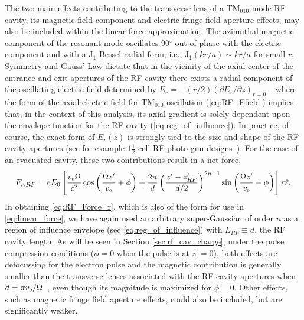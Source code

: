 The two main effects contributing to the transverse lens of a $\text{TM}_{010}$-mode RF cavity, its magnetic field component and electric fringe field aperture effects, may also be included within the linear force approximation.
The azimuthal magnetic component of the resonant mode oscillates 90$^{\circ}$ out of phase with the electric component and with a $\operatorname{ J_{1} }$ Bessel radial form; i.e., $ \operatorname{ J_{1} }( k r / a ) \sim k r / a $ for small $r$.
Symmetry and Gauss' Law dictate that in the vicinity of the axial center of the entrance and exit apertures of the RF cavity there exists a radial component of the oscillating electric field determined by $ E_{r} = -\left ( r / 2 \right ) \left ( \partial E_{z} / \partial z \right )_{r=0} $~\cite{kim_rf_1989}, where the form of the axial electric field for $\text{TM}_{010}$ oscillation (\ref{eq:RF_Efield}) implies that, in the context of this analysis, its axial gradient is solely dependent upon the envelope function for the RF cavity (\ref{eq:reg_of_influence}).
In practice, of course, the exact form of $E_{r}(z)$ is strongly tied to the size and shape of the RF cavity apertures (see for example $1 \frac{1}{2}$-cell RF photo-gun designs~\cite{mcdonald_design_1988}). 
For the case of an evacuated cavity, these two contributions result in a net force,
\begin{equation} \label{eq:RF_Force_r}
  F_{ r , RF } = e E_{0} \left [ 
    \frac{ v_{{\scriptscriptstyle 0}} \Omega }{c^{2}} \cos \left ( \frac{ \Omega z^{\prime} }{ v_{{\scriptscriptstyle 0}} } + \phi \right ) + \frac{2 n}{d} \left ( \frac{z^{\prime} - z^{\prime}_{RF}}{d / 2} \right )^{2 n - 1} \sin \left ( \frac{ \Omega z^{\prime} }{ v_{{\scriptscriptstyle 0}} } + \phi \right )
   \right ] r \hat{ r } \text{.}
\end{equation}
In obtaining \ref{eq:RF_Force_r}, which is also of the form for use in \ref{eq:linear_force}, we have again used an arbitrary super-Gaussian of order $n$ as a region of influence envelope (see \ref{eq:reg_of_influence}) with $L_{RF} \equiv d$, the RF cavity length.
As will be seen in Section \ref{sec:rf_cav_charge}, under the pulse compression conditions ($\phi = 0$ when the pulse is at $z^{\prime} = 0$), both effects are defocussing for the electron pulse and the magnetic contribution is generally smaller than the transverse lenses associated with the RF cavity apertures when $ d = \pi v_{{\scriptscriptstyle 0}} / \Omega $~\cite{kim_rf_1989}, even though its magnitude is maximized for $\phi = 0$.
Other effects, such as magnetic fringe field aperture effects, could also be included, but are significantly weaker.

